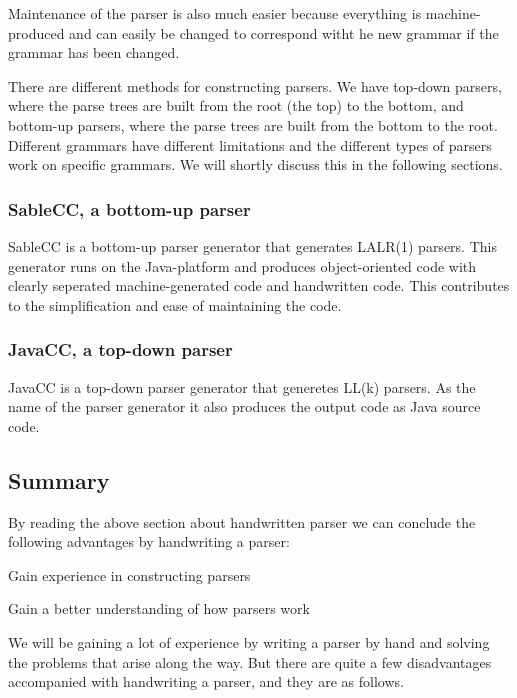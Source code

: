 Maintenance of the parser is also much easier because everything is machine-produced and can easily be changed to correspond witht he new grammar if the grammar has been changed.

There are different methods for constructing parsers. We have top-down parsers, where the parse trees are built from the root (the top) to the bottom, and bottom-up parsers, where the parse trees are built from the bottom to the root. Different grammars have different limitations and  the different types of parsers work on specific grammars. We will shortly discuss this in the following sections.

\subsubsection{SableCC, a bottom-up parser}
\label{sec:ana-sablecc}
SableCC is a bottom-up parser generator that generates LALR(1) parsers. This generator runs on the Java-platform and produces object-oriented code with clearly seperated machine-generated code and handwritten code. This contributes to the simplification and ease of maintaining the code.\cite[pp. 11]{sableccdoc}

\subsubsection{JavaCC, a top-down parser}
\label{sec:ana-javacc}
JavaCC is a top-down parser generator that generetes LL(k) parsers. As the name of the parser generator it also produces the output code as Java source code.\cite{wiki-javacc}

\subsection{Summary}
\label{sec:ana-parsersum}
By reading the above section about handwritten parser we can conclude the following advantages by handwriting a parser:

\begin{dlist}
\item Gain experience in constructing parsers
\item Gain a better understanding of how parsers work
\end{dlist}

We will be gaining a lot of experience by writing a parser by hand and solving the problems that arise along the way. But there are quite a few disadvantages accompanied with handwriting a parser, and they are as follows.

